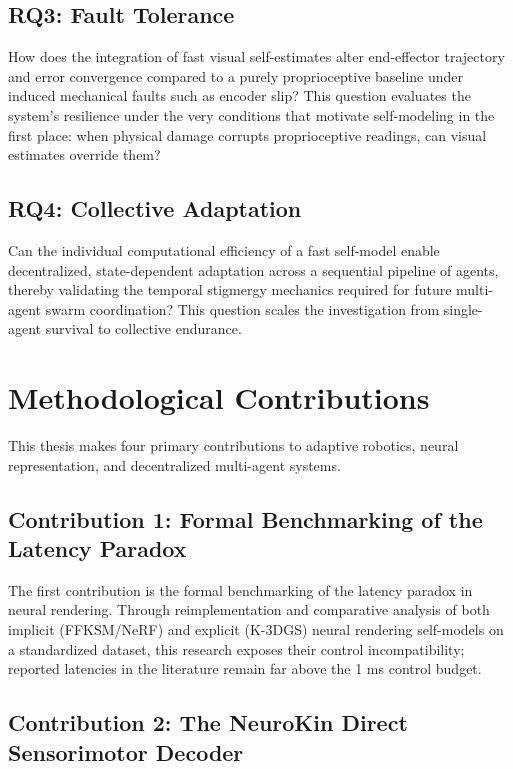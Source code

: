 \documentclass[12pt,a4paper,oneside]{report}
\begin{document}
\subsection{RQ3: Fault Tolerance}
\label{subsec:rq3}

How does the integration of fast visual self-estimates alter end-effector trajectory and error convergence compared to a purely proprioceptive baseline under induced mechanical faults such as encoder slip? This question evaluates the system's resilience under the very conditions that motivate self-modeling in the first place: when physical damage corrupts proprioceptive readings, can visual estimates override them?

\subsection{RQ4: Collective Adaptation}
\label{subsec:rq4}

Can the individual computational efficiency of a fast self-model enable decentralized, state-dependent adaptation across a sequential pipeline of agents, thereby validating the temporal stigmergy mechanics required for future multi-agent swarm coordination? This question scales the investigation from single-agent survival to collective endurance.

\section{Methodological Contributions}
\label{sec:methodological_contributions}

This thesis makes four primary contributions to adaptive robotics, neural representation, and decentralized multi-agent systems.

\subsection{Contribution 1: Formal Benchmarking of the Latency Paradox}
\label{subsec:contrib_benchmarking}

The first contribution is the formal benchmarking of the latency paradox in neural rendering. Through reimplementation and comparative analysis of both implicit (FFKSM/NeRF) and explicit (K-3DGS) neural rendering self-models on a standardized dataset, this research exposes their control incompatibility; reported latencies in the literature remain far above the 1 ms control budget.

\subsection{Contribution 2: The NeuroKin Direct Sensorimotor Decoder}
\label{subsec:contrib_neurokin}
\end{document}
